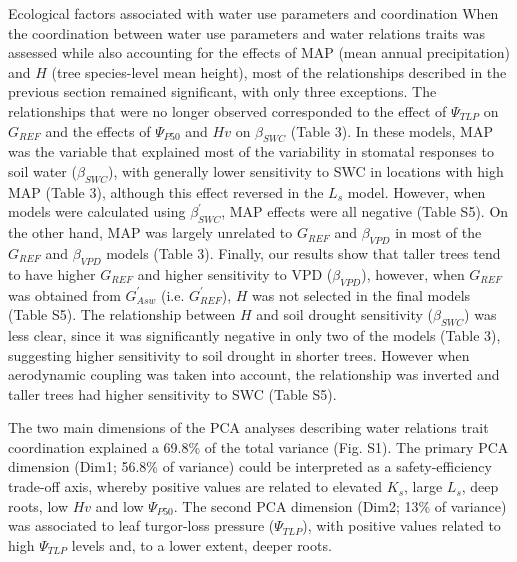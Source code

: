 \documentclass[11pt,twoside]{reedthesis}
\begin{document}
Ecological factors associated with water use parameters and coordination
When the coordination between water use parameters and water relations
traits was assessed while also accounting for the effects of MAP (mean
annual precipitation) and \(H\) (tree species-level mean height), most
of the relationships described in the previous section remained
significant, with only three exceptions. The relationships that were no
longer observed corresponded to the effect of \(\Psi_{TLP}\) on
\(G_{REF}\) and the effects of \textbar{}\(\Psi_{P50}\)\textbar{} and
\(Hv\) on \(\beta_{SWC}\) (Table 3). In these models, MAP was the
variable that explained most of the variability in stomatal responses to
soil water (\(\beta_{SWC}\)), with generally lower sensitivity to SWC in
locations with high MAP (Table 3), although this effect reversed in the
\(L_s\) model. However, when models were calculated using
\(\beta_{SWC}^{'}\), MAP effects were all negative (Table S5). On the
other hand, MAP was largely unrelated to \(G_{REF}\) and \(\beta_{VPD}\)
in most of the \(G_{REF}\) and \(\beta_{VPD}\) models (Table 3).
Finally, our results show that taller trees tend to have higher
\(G_{REF}\) and higher sensitivity to VPD (\(\beta_{VPD}\)), however,
when \(G_{REF}\) was obtained from \(G_{Asw}^{'}\) (i.e.
\(G_{REF}^{'}\)), \(H\) was not selected in the final models (Table S5).
The relationship between \(H\) and soil drought sensitivity
(\(\beta_{SWC}\)) was less clear, since it was significantly negative in
only two of the models (Table 3), suggesting higher sensitivity to soil
drought in shorter trees. However when aerodynamic coupling was taken
into account, the relationship was inverted and taller trees had higher
sensitivity to SWC (Table S5).\par

The two main dimensions of the PCA analyses describing water relations
trait coordination explained a 69.8\% of the total variance (Fig. S1).
The primary PCA dimension (Dim1; 56.8\% of variance) could be
interpreted as a safety-efficiency trade-off axis, whereby positive
values are related to elevated \(K_s\), large \(L_s\), deep roots, low
\(Hv\) and low \textbar{}\(\Psi_{P50}\)\textbar{}. The second PCA
dimension (Dim2; 13\% of variance) was associated to leaf turgor-loss
pressure (\(\Psi_{TLP}\)), with positive values related to high
\textbar{}\(\Psi_{TLP}\)\textbar{} levels and, to a lower extent, deeper
roots.\par
\end{document}

